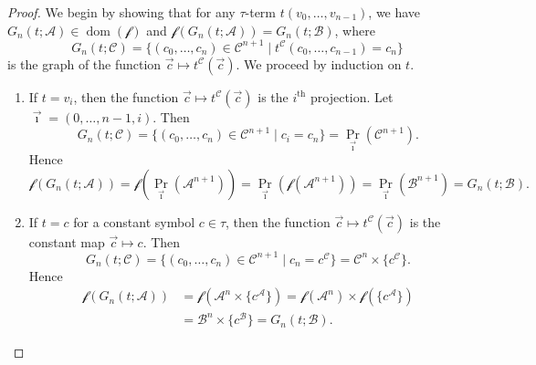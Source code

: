 \documentclass[10pt,a4paper]{amsart}
\newcommand{\A}{\mathcal{A}}
\newcommand{\B}{\mathcal{B}}
\newcommand{\C}{\mathcal{C}}
\DeclareMathOperator{\dom}{dom}
\newcommand{\f}{\mathcal{f}}
\begin{document}
\begin{proof}

    We begin by showing that for any $\tau$-term $t(v_0,\dots,v_{n-1})$, we have $G_n(t;\A)\in\dom(\f)$ and $\f(G_n(t;\A)) = G_n(t;\B)$, where
    \[
        G_n(t;\C) = \{ (c_0,\dots,c_n)\in\C^{n+1} \mid t^\C(c_0,\dots,c_{n-1}) = c_n \}
    \]
    is the graph of the function $\vec c\mapsto t^\C(\vec c)$. We proceed by induction on $t$.
    \begin{enumerate}
        \item If $t = v_i$, then the function $\vec c\mapsto t^\C(\vec c)$ is the $i^{\text{th}}$ projection. Let $\vec\imath = (0,\dots,n-1,i)$. Then
        \[
            G_n(t;\C) = \{ (c_0,\dots,c_n)\in\C^{n+1} \mid c_i = c_n \} = \Pr_{\vec\imath}(\C^{n+1}).
        \]
        Hence
        \[
            \f(G_n(t;\A)) = \f(\Pr_{\vec\imath}(\A^{n+1})) = \Pr_{\vec\imath}(\f(\A^{n+1})) = \Pr_{\vec\imath}(\B^{n+1}) = G_n(t;\B).
        \]

        \item If $t = c$ for a constant symbol $c\in\tau$, then the function $\vec c\mapsto t^\C(\vec c)$ is the constant map $\vec c \mapsto c$. Then
        \[
            G_n(t;\C) = \{ (c_0,\dots,c_n)\in\C^{n+1} \mid c_n = c^\C \} = \C^n\times\{c^\C\}.
        \]
        Hence
        \begin{align*}
            \f(G_n(t;\A)) &= \f(\A^n\times\{c^\A\}) = \f(\A^n)\times\f(\{c^\A\}) \\
            &= \B^n\times\{c^\B\} = G_n(t;\B).
        \end{align*}


\end{enumerate}
\end{proof}
\end{document}
